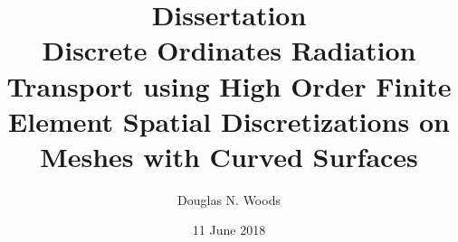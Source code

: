 \documentclass[12pt]{article}
\begin{document}

\title{Dissertation \\Discrete Ordinates Radiation Transport using High Order Finite Element Spatial Discretizations on Meshes with Curved Surfaces}
\date{11 June 2018}
\author{Douglas N. Woods}
\maketitle

%

%

%

%

%

\pagebreak
\tableofcontents
\thispagestyle{empty}

\pagebreak
\listoffigures
\thispagestyle{empty}

\pagebreak
\listoftables
\thispagestyle{empty}

\pagebreak
{}
\end{document}
